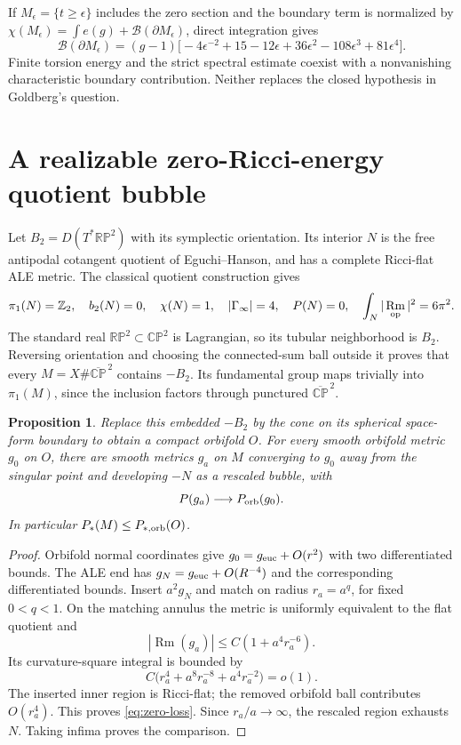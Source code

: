 \documentclass[11pt]{article}
\newtheorem{proposition}[theorem]{Proposition}
\DeclareMathOperator{\Rm}{Rm}
\newcommand{\CP}{\mathbb{CP}}
\newcommand{\RP}{\mathbb{RP}}
\begin{document}
If $M_\epsilon=\{t\ge\epsilon\}$ includes the zero section and the boundary term is normalized by $\chi(M_\epsilon)=\int e(g)+\mathcal B(\partial M_\epsilon)$, direct integration gives
\[
 \mathcal B(\partial M_\epsilon)
 =(g-1)\big[-4\epsilon^{-2}+15-12\epsilon
     +36\epsilon^2-108\epsilon^3+81\epsilon^4\big].
\]
Finite torsion energy and the strict spectral estimate coexist with a nonvanishing characteristic boundary contribution. Neither replaces the closed hypothesis in Goldberg's question.

\section{A realizable zero-Ricci-energy quotient bubble}
Let $B_2=D(T^*\RP^2)$ with its symplectic orientation. Its interior $N$ is the free antipodal cotangent quotient of Eguchi--Hanson, and has a complete Ricci-flat ALE metric. The classical quotient construction \cite{Wright} gives
\begin{equation}\label{eq:ball}
 \pi_1(N)=\mathbb Z_2,\quad b_2(N)=0,\quad
 \chi(N)=1,\quad |\Gamma_\infty|=4,\quad
 P(N)=0,\quad \int_N|\Rm_{\rm op}|^2=6\pi^2.
\end{equation}
The standard real $\RP^2\subset\CP^2$ is Lagrangian, so its tubular neighborhood is $B_2$. Reversing orientation and choosing the connected-sum ball outside it proves that every $M=X\#\overline{\CP}^{\,2}$ contains $-B_2$. Its fundamental group maps trivially into $\pi_1(M)$, since the inclusion factors through punctured $\overline{\CP}^{\,2}$.

\begin{proposition}\label{prop:gluing}
Replace this embedded $-B_2$ by the cone on its spherical space-form boundary to obtain a compact orbifold $O$. For every smooth orbifold metric $g_0$ on $O$, there are smooth metrics $g_a$ on $M$ converging to $g_0$ away from the singular point and developing $-N$ as a rescaled bubble, with
\begin{equation}\label{eq:zero-loss}
 P(g_a)\longrightarrow P_{\rm orb}(g_0).
\end{equation}
In particular $P_*(M)\le P_{*,\rm orb}(O)$.
\end{proposition}

\begin{proof}
Orbifold normal coordinates give $g_0=g_{\rm euc}+O(r^2)$ with two differentiated bounds. The ALE end has $g_N=g_{\rm euc}+O(R^{-4})$ and the corresponding differentiated bounds. Insert $a^2g_N$ and match on radius $r_a=a^q$, for fixed $0<q<1$. On the matching annulus the metric is uniformly equivalent to the flat quotient and
\[
 |\Rm(g_a)|\le C(1+a^4r_a^{-6}).
\]
Its curvature-square integral is bounded by
\[
 C\big(r_a^4+a^8r_a^{-8}+a^4r_a^{-2}\big)=o(1).
\]
The inserted inner region is Ricci-flat; the removed orbifold ball contributes $O(r_a^4)$. This proves \eqref{eq:zero-loss}. Since $r_a/a\to\infty$, the rescaled region exhausts $N$. Taking infima proves the comparison.
\end{proof}
\end{document}
